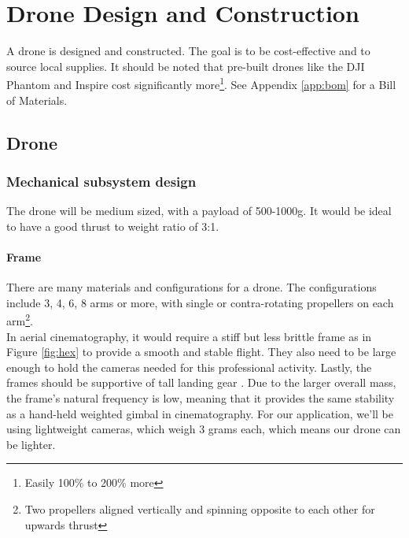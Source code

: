 \chapter{Drone Design and Construction}

A drone is designed and constructed. The goal is to be cost-effective and to source local supplies. It should be noted that pre-built drones like the DJI Phantom and Inspire cost significantly more\footnote{Easily 100\% to 200\% more}. See Appendix \ref{app:bom} for a Bill of Materials.

\section{Drone}

\subsection{Mechanical subsystem design}

The drone will be medium sized, with a payload of 500-1000g. It would be ideal to have a good thrust to weight ratio of 3:1.

\subsubsection{Frame}

There are many materials and configurations for a drone. The configurations include 3, 4, 6, 8 arms or more, with single or contra-rotating propellers on each arm\footnote{Two propellers aligned vertically and spinning opposite to each other for upwards thrust}. \\

In aerial cinematography, it would require a stiff but less brittle frame as in Figure \ref{fig:hex} to provide a smooth and stable flight. They also need to be large enough to hold the cameras needed for this professional activity. Lastly, the frames should be supportive of tall landing gear \cite{frame}. Due to the larger overall mass, the frame's natural frequency is low, meaning that it provides the same stability as a hand-held weighted gimbal in cinematography. For our application, we'll be using lightweight cameras, which weigh 3 grams each, which means our drone can be lighter.\\

